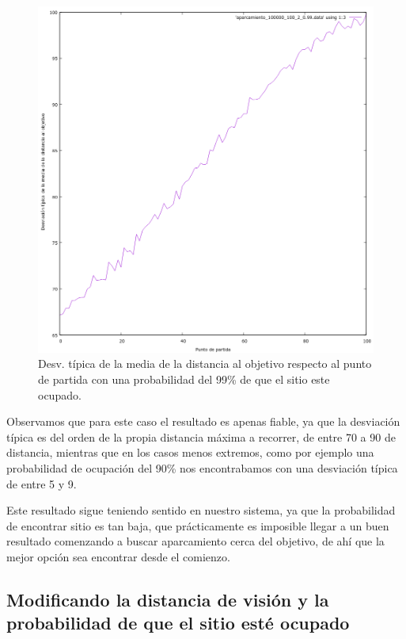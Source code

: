 \documentclass[12pt, spanish]{article}
\begin{document}
\begin{figure}[H]
	\centering
	\includegraphics[scale = 0.6]{aparcamiento_desv_100000_100_2_0-99.png}
	\caption{Desv. típica de la media de la distancia al objetivo respecto al punto de partida con una probabilidad del 99\% de que el sitio este ocupado.}
	\label{fig:ej4}
\end{figure}


Observamos que para este caso el resultado es apenas fiable, ya que la desviación típica es del orden de la propia distancia máxima a recorrer, de entre 70 a 90 de distancia, mientras que en los casos menos extremos, como por ejemplo una probabilidad de ocupación del 90\% nos encontrabamos con una desviación típica de entre 5 y 9.

Este resultado sigue teniendo sentido en nuestro sistema, ya que la probabilidad de encontrar sitio es tan baja, que prácticamente es imposible llegar a un buen resultado comenzando a buscar aparcamiento cerca del objetivo, de ahí que la mejor opción sea encontrar desde el comienzo.

\subsection{Modificando la distancia de visión y la probabilidad de que el sitio esté ocupado}
\end{document}
